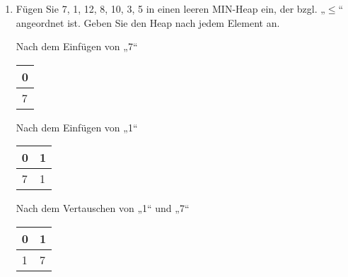 \documentclass{bschlangaul-aufgabe}
\begin{document}
\begin{enumerate}
\begin{enumerate}
\begin{bBaum}{Nach dem Löschen von „1“}
\end{bBaum}


\item Fügen Sie 7, 1, 12, 8, 10, 3, 5 in einen leeren MIN-Heap ein,
der bzgl. „$\leq$“ angeordnet ist.
Geben Sie den Heap nach jedem Element an.

\begin{bBaum}{Nach dem Einfügen von „7“}
\begin{tabular}{l}
\bf{0} \\
\hline
7      \\
\end{tabular}

\end{bBaum}

\begin{bBaum}{Nach dem Einfügen von „1“}
\begin{tabular}{ll}
\bf{0} & \bf{1} \\
\hline
7      & 1      \\
\end{tabular}

\end{bBaum}

\begin{bBaum}{Nach dem Vertauschen von „1“ und „7“}
\begin{tabular}{ll}
\bf{0} & \bf{1} \\
\hline
1      & 7      \\
\end{tabular}

\end{bBaum}


\end{enumerate}
\end{enumerate}
\end{document}
